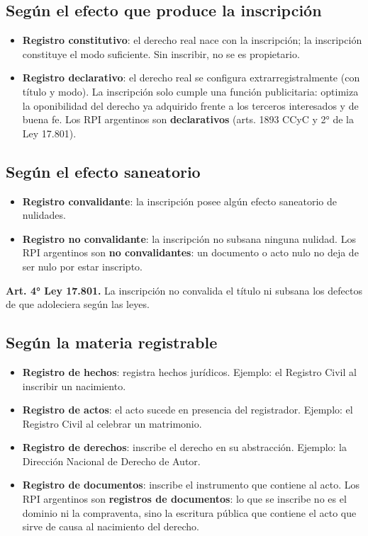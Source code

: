 \documentclass[12pt,oneside]{book}
\begin{document}
\subsection{Según el efecto que produce la inscripción}

\begin{itemize}
\item \textbf{Registro constitutivo}: el derecho real nace con la inscripción; la inscripción constituye el modo suficiente. Sin inscribir, no se es propietario.
\item \textbf{Registro declarativo}: el derecho real se configura extrarregistralmente (con título y modo). La inscripción solo cumple una función publicitaria: optimiza la oponibilidad del derecho ya adquirido frente a los terceros interesados y de buena fe. Los RPI argentinos son \textbf{declarativos} (arts. 1893 CCyC y 2° de la Ley 17.801).
\end{itemize}

\subsection{Según el efecto saneatorio}

\begin{itemize}
\item \textbf{Registro convalidante}: la inscripción posee algún efecto saneatorio de nulidades.
\item \textbf{Registro no convalidante}: la inscripción no subsana ninguna nulidad. Los RPI argentinos son \textbf{no convalidantes}: un documento o acto nulo no deja de ser nulo por estar inscripto.
\end{itemize}

\begin{note}
\textbf{Art. 4° Ley 17.801.} La inscripción no convalida el título ni subsana los defectos de que adoleciera según las leyes.
\end{note}

\subsection{Según la materia registrable}

\begin{itemize}
\item \textbf{Registro de hechos}: registra hechos jurídicos. Ejemplo: el Registro Civil al inscribir un nacimiento.
\item \textbf{Registro de actos}: el acto sucede en presencia del registrador. Ejemplo: el Registro Civil al celebrar un matrimonio.
\item \textbf{Registro de derechos}: inscribe el derecho en su abstracción. Ejemplo: la Dirección Nacional de Derecho de Autor.
\item \textbf{Registro de documentos}: inscribe el instrumento que contiene al acto. Los RPI argentinos son \textbf{registros de documentos}: lo que se inscribe no es el dominio ni la compraventa, sino la escritura pública que contiene el acto que sirve de causa al nacimiento del derecho.
\end{itemize}
\end{document}
